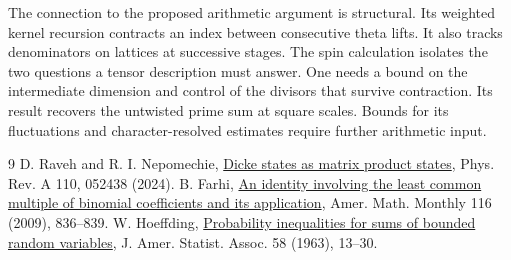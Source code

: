 \documentclass[11pt]{article}
\begin{document}
The connection to the proposed arithmetic argument is structural. Its weighted kernel recursion contracts an index between consecutive theta lifts. It also tracks denominators on lattices at successive stages. The spin calculation isolates the two questions a tensor description must answer. One needs a bound on the intermediate dimension and control of the divisors that survive contraction. Its result recovers the untwisted prime sum at square scales. Bounds for its fluctuations and character-resolved estimates require further arithmetic input.
\begin{thebibliography}{9}
 D. Raveh and R. I. Nepomechie, \href{https://arxiv.org/abs/2408.04729}{Dicke states as matrix product states}, Phys. Rev. A 110, 052438 (2024).
 B. Farhi, \href{https://arxiv.org/abs/0906.2295}{An identity involving the least common multiple of binomial coefficients and its application}, Amer. Math. Monthly 116 (2009), 836--839.
 W. Hoeffding, \href{https://doi.org/10.1080/01621459.1963.10500830}{Probability inequalities for sums of bounded random variables}, J. Amer. Statist. Assoc. 58 (1963), 13--30.
\end{thebibliography}
\end{document}
